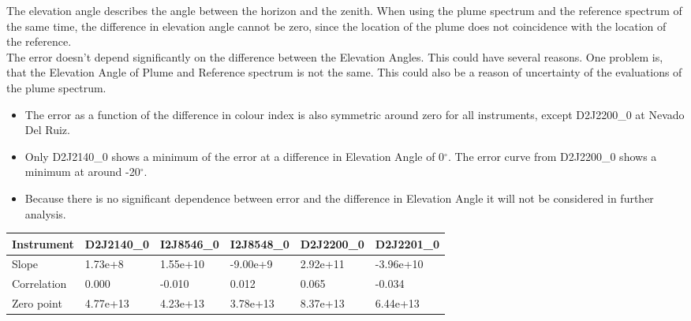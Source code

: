 \documentclass  [
  paper    = a4,
  BCOR     = 10mm,
  twoside,
  fontsize = 12pt,
  fleqn,
  toc      = bibnumbered,
  toc      = listofnumbered,
  numbers  = noendperiod,
  headings = normal,
  listof   = leveldown,
  version  = 3.03
]                                       {scrreprt}
\begin{document}
	The elevation angle describes the angle between the horizon and the zenith. When using the plume spectrum and the reference spectrum of the same time, the difference in elevation angle cannot be zero, since the location of the plume does not coincidence with the location of the reference.\\
	The  error doesn't depend significantly on the difference between the Elevation Angles. This could have several reasons. One problem is, that the Elevation Angle of Plume and Reference spectrum is not the same. This could also be a reason of uncertainty of the evaluations of the plume spectrum.

	\begin{itemize}
		\item The   error as a function of the difference in colour index is also symmetric around zero for all instruments, except  D2J2200\_0 at Nevado Del Ruiz. 
		\item Only D2J2140\_0 shows a minimum of the   error at a difference in Elevation Angle of 0$^{\circ}$. The   error curve from D2J2200\_0 shows a minimum at around -20$^{\circ}$.
		\item Because there is no significant dependence between   error and the difference in Elevation Angle it will not be considered in further analysis.
	\end{itemize}
	\begin{table}[h]
		\begin{tabular}{|p{2cm}|p{2cm}|p{2cm}|p{2cm}|p{2cm}|p{2cm}|}
			Instrument	&D2J2140\_0&I2J8546\_0& I2J8548\_0&D2J2200\_0&D2J2201\_0\\
			\toprule
			Slope& 1.73e+8& 1.55e+10  &-9.00e+9 &2.92e+11&-3.96e+10\\
			\midrule
			Correlation&
			0.000&
			-0.010&
			0.012&
			0.065&
			-0.034\\
			\midrule
			Zero point&4.77e+13&4.23e+13&3.78e+13&8.37e+13 &6.44e+13 \\
			\bottomrule
		\end{tabular}
	\end{table}
\end{document}
